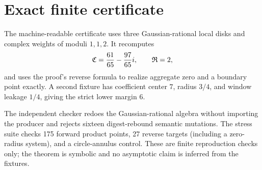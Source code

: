 \section{Exact finite certificate}

The machine-readable certificate uses three Gaussian-rational local disks and
complex weights of moduli $1,1,2$.  It recomputes
\[
 \mathfrak{C}=\frac{61}{65}-\frac{97}{65}i,\qquad \mathfrak{R}=2,
\]
and uses the proof's reverse formula to realize aggregate zero and a boundary
point exactly.  A second fixture has coefficient center $7$, radius $3/4$,
and window leakage $1/4$, giving the strict lower margin $6$.

The independent checker redoes the Gaussian-rational algebra without importing
the producer and rejects sixteen digest-rebound semantic mutations.  The stress
suite checks 175 forward product points, 27 reverse targets (including a
zero-radius system), and a circle-annulus control.  These are finite
reproduction checks only; the theorem is symbolic and no asymptotic claim is
inferred from the fixtures.
